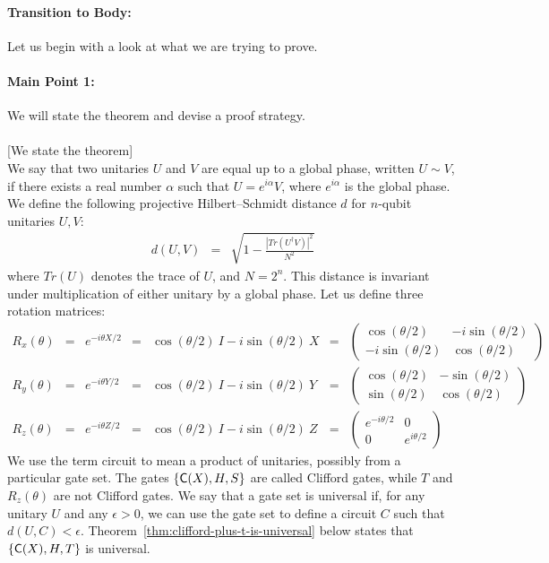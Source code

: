\documentclass[11pt]{article}
\def\({\begin{eqnarray*}}
\def\){\end{eqnarray*}}
\def\C#1{\text{\sf C}{(#1)}}
\begin{document}
\paragraph{Transition to Body:} 
Let us begin with a look at what we are trying to prove.

\paragraph{Main Point 1:}
We will state the theorem and devise a proof strategy. \\
\mbox{} \\ \hspace*{1cm}
   [We state the theorem] \\ 
We say that two unitaries $U$ and $V$ are equal up to a global phase,
written $U \sim V$, if there exists a real number $\alpha$ such that
$U = e^{i\alpha} V$, where $e^{i\alpha}$ is the global phase.
%
We define the following projective Hilbert–Schmidt distance $d$ for
$n$-qubit unitaries $U, V$:
\(
d(U,V) &=& 
\sqrt{ 1 - \frac{ | Tr( U^\dagger V ) |^2 }{ N^2 } }
\) 
where $Tr(U)$ denotes the trace of $U$, and $N = 2^n$.
This distance is invariant under multiplication of either unitary by 
a global phase.
%
Let us define three rotation matrices:
\[
\begin{array}{rclclcl}
R_x(\theta) &=& 
e^{-i\theta X/2}
&=&
\cos(\theta/2)\ I - i\sin(\theta/2)\ X
&=&
\left(
\begin{array}{cc}
\cos(\theta/2)    & -i \sin(\theta/2) \\
-i \sin(\theta/2) & \cos(\theta/2)
\end{array}
\right)
\\
R_y(\theta) &=&
e^{-i\theta Y/2}
&=&
\cos(\theta/2)\ I - i\sin(\theta/2)\ Y
&=&
\left(
\begin{array}{cc}
\cos(\theta/2)    & -\sin(\theta/2) \\
\sin(\theta/2) & \cos(\theta/2)
\end{array}
\right)
\\
R_z(\theta) &=&
e^{-i\theta Z/2}
&=&
\cos(\theta/2)\ I - i\sin(\theta/2)\ Z
&=&
\left(
\begin{array}{cc}
e^{-i\theta/2} & 0 \\
0              & e^{i\theta/2}
\end{array}
\right)
\end{array}
\]
%
We use the term circuit to mean a product of unitaries,
possibly from a particular gate set.  
The gates $\{\C{X}, H, S\}$ are called Clifford gates,
while $T$ and $R_z(\theta)$ are not Clifford gates.
We say that a gate set is universal if,
for any unitary $U$ and any $\epsilon > 0$, 
we can use the gate set to define a circuit $C$
such that $d(U,C) < \epsilon$.
Theorem~\ref{thm:clifford-plus-t-is-universal} below states that 
$\{\C{X}, H, T\}$ is universal.
\end{document}
